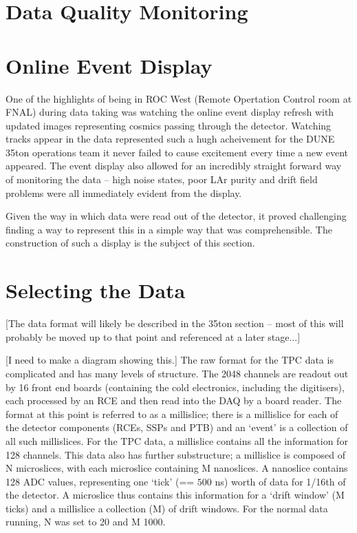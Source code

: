 \section{Data Quality Monitoring}\label{sec:DQM}



\section{Online Event Display}\label{sec:EventDisplay}

One of the highlights of being in ROC West (Remote Opertation Control room at FNAL) during data taking was watching the online event display refresh with updated images representing cosmics passing through the detector.  Watching tracks appear in the data represented such a hugh acheivement for the DUNE 35ton operations team it never failed to cause excitement every time a new event appeared.  The event display also allowed for an incredibly straight forward way of monitoring the data -- high noise states, poor LAr purity and drift field problems were all immediately evident from the display.

Given the way in which data were read out of the detector, it proved challenging finding a way to represent this in a simple way that was comprehensible.  The construction of such a display is the subject of this section.

\section{Selecting the Data}\label{sec:SelectingEVDData}

[The data format will likely be described in the 35ton section -- most of this will probably be moved up to that point and referenced at a later stage...]

[I need to make a diagram showing this.] The raw format for the TPC data is complicated and has many levels of structure.  The 2048 channels are readout out by 16 front end boards (containing the cold electronics, including the digitisers), each processed by an RCE and then read into the DAQ by a board reader.  The format at this point is referred to as a millislice; there is a millislice for each of the detector components (RCEs, SSPs and PTB) and an `event' is a collection of all such millislices.  For the TPC data, a millislice contains all the information for 128 channels.  This data also has further substructure; a millislice is composed of N microslices, with each microslice containing M nanoslices.  A nanoslice contains 128 ADC values, representing one `tick' (== $500$ ns) worth of data for 1/16th of the detector.  A microslice thus contains this information for a `drift window' (M ticks) and a millislice a collection (M) of drift windows.  For the normal data running, N was set to 20 and M 1000.

